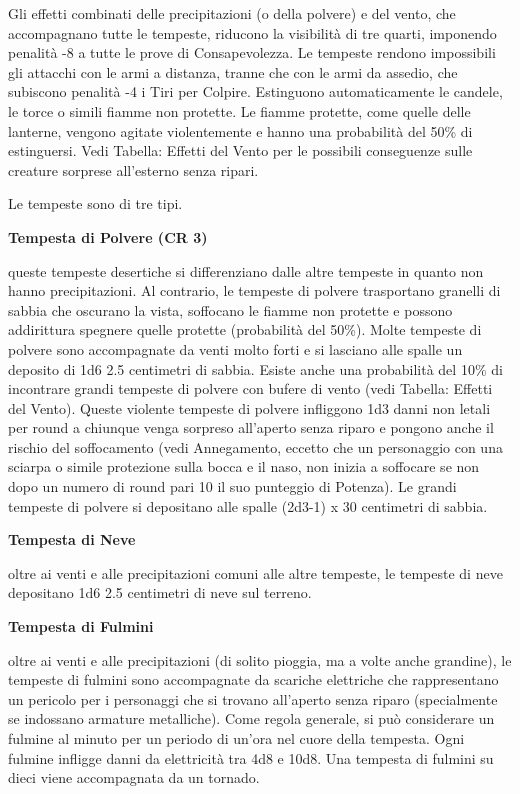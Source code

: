 \documentclass[a4paper,11pt,twoside,openany]{book}
\begin{document}
Gli effetti combinati delle precipitazioni (o della polvere) e del vento, che accompagnano tutte le tempeste, riducono la visibilità di tre quarti, imponendo penalità -8 a tutte le prove di Consapevolezza. Le tempeste rendono impossibili gli attacchi con le armi a distanza, tranne che con le armi da assedio, che subiscono penalità -4 i Tiri per Colpire.
Estinguono automaticamente le candele, le torce o simili fiamme non protette. Le fiamme protette, come quelle delle lanterne, vengono agitate violentemente e hanno una probabilità del 50\% di estinguersi. Vedi Tabella: Effetti del Vento per le possibili conseguenze sulle creature sorprese all'esterno senza ripari.

Le tempeste sono di tre tipi.

\textbf{Tempesta di Polvere (CR 3)}

queste tempeste desertiche si differenziano dalle altre tempeste in quanto non hanno precipitazioni. Al contrario, le tempeste di polvere trasportano granelli di sabbia che oscurano la vista, soffocano le fiamme non protette e possono addirittura spegnere quelle protette (probabilità del 50\%). Molte tempeste di polvere sono accompagnate da venti molto forti e si lasciano alle spalle un deposito di 1d6 \texttimes{} 2.5 centimetri di sabbia.
Esiste anche una probabilità del 10\% di incontrare grandi tempeste di polvere con bufere di vento (vedi Tabella: Effetti del Vento). Queste violente tempeste di polvere infliggono 1d3 danni non letali per round a chiunque venga sorpreso all'aperto senza riparo e pongono anche il rischio del soffocamento (vedi Annegamento, eccetto che un personaggio con una sciarpa o simile protezione sulla bocca e il naso, non inizia a soffocare se non dopo un numero di round pari 10 \texttimes{} il suo punteggio di Potenza). Le grandi tempeste di polvere si depositano alle spalle (2d3-1) x 30 centimetri di sabbia.

\textbf{Tempesta di Neve}

oltre ai venti e alle precipitazioni comuni alle altre tempeste, le tempeste di neve depositano 1d6 \texttimes{} 2.5 centimetri di neve sul terreno.

\textbf{Tempesta di Fulmini}

oltre ai venti e alle precipitazioni (di solito pioggia, ma a volte anche grandine), le tempeste di fulmini sono accompagnate da scariche elettriche che rappresentano un pericolo per i personaggi che si trovano all'aperto senza riparo (specialmente se indossano armature metalliche). Come regola generale, si può considerare un fulmine al minuto per un periodo di un'ora nel cuore della tempesta. Ogni fulmine infligge danni da elettricità tra 4d8 e 10d8. Una tempesta di fulmini su dieci viene accompagnata da un tornado.
\end{document}
